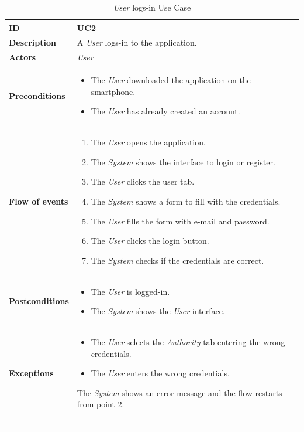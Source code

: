 \documentclass {article}
\begin{document}
	\begin{longtable}{| p{3 cm} | p{10.5 cm} |} 
			\hline
			{\bf ID} & UC2 \\
			\hline
			{\bf Description} & A {\it User} logs-in to the application.\\
			\hline
			{\bf Actors} & {\it User}\\
			\hline
			{\bf Preconditions} & 	
			\begin{itemize}
				\item The {\it User} downloaded the application on the smartphone.
				\item The {\it User} has already created an account.
			\end{itemize}
			\\
			\hline
			{\bf Flow of events} &	
			\begin{enumerate}
				\item The {\it User} opens the application.
				\item The {\it System} shows the interface to login or register.
				\item The {\it User} clicks the user tab.
				\item The {\it System} shows a form to fill with the credentials.
				\item The {\it User} fills the form with e-mail and password. 
				\item The {\it User} clicks the login button.
				\item The {\it System} checks if the credentials are correct. 
			\end{enumerate}
			\\
			\hline
			{\bf Postconditions} & 
			\begin{itemize}
				\item The {\it User} is logged-in.
				\item The {\it System} shows the {\it User} interface.
			\end{itemize}
			\\
			\hline
			{\bf Exceptions} & 	
			\begin{itemize}
				\item The {\it User} selects the {\it Authority} tab entering the wrong credentials. 
				\item The {\it User} enters the wrong credentials.
			\end{itemize}
			The {\it System} shows an error message and the flow restarts from point 2.
			\\ \\
			\hline
			\caption{{\it User} logs-in Use Case}
			\end{longtable}
			
\end{document}
